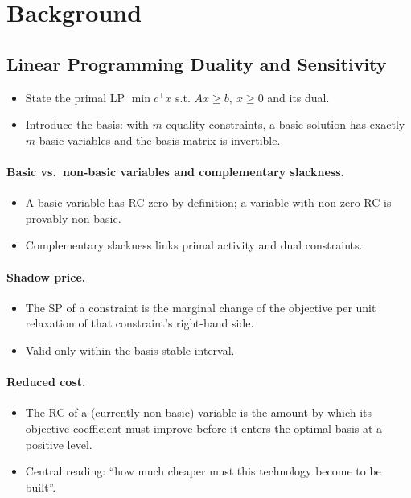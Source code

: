 \section{Background}
\label{sec:background}

\subsection{Linear Programming Duality and Sensitivity}
\label{sec:lp-duality}
\begin{itemize}
	\item State the primal LP $\min c^\top x$ s.t. $Ax \ge b,\ x \ge 0$ and its dual.
	\item Introduce the basis: with $m$ equality constraints, a basic solution
	has exactly $m$ basic variables and the basis matrix is invertible.
\end{itemize}

\paragraph{Basic vs.\ non-basic variables and complementary slackness.}
\begin{itemize}
	\item A basic variable has \ac{RC} zero by definition; a variable with
	non-zero \ac{RC} is provably non-basic.
	\item Complementary slackness links primal activity and dual constraints.
\end{itemize}

\paragraph{Shadow price.}
\begin{itemize}
	\item The \ac{SP} of a constraint is the marginal change of the objective
	per unit relaxation of that constraint's right-hand side.
	\item Valid only within the basis-stable interval.
\end{itemize}

\paragraph{Reduced cost.}
\begin{itemize}
	\item The \ac{RC} of a (currently non-basic) variable is the amount by which
	its objective coefficient must improve before it enters the optimal basis at
	a positive level.
	\item Central reading: ``how much cheaper must this technology become to be
	built''.
\end{itemize}

